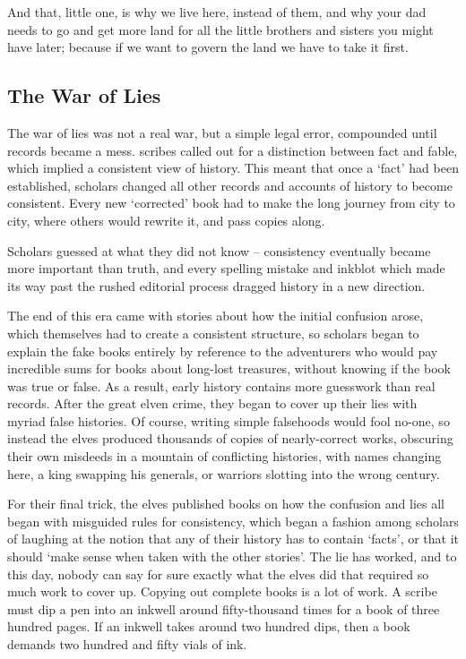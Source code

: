 \begin{multicols}{2}
\begin{exampletext}
  And that, little one, is why we live here, instead of them, and why your dad needs to go and get more land for all the little brothers and sisters you might have later; because if we want to govern the land we have to take it first.
\fi

\end{exampletext}

\subsection{The War of Lies}
\label{warOfLies}

\begin{exampletext}
  \ifcase\value{r4}\relax\or
    The war of lies was not a real war, but a simple legal error, compounded until records became a mess.
    \Glspl{scribe} called out for a distinction between fact and fable, which implied a consistent view of history.
    This meant that once a `fact' had been established, scholars changed all other records and accounts of history to become consistent.
    Every new `corrected' book had to make the long journey from city to city, where others would rewrite it, and pass copies along.

    Scholars guessed at what they did not know -- consistency eventually became more important than truth, and every spelling mistake and inkblot which made its way past the rushed editorial process dragged history in a new direction.

    The end of this era came with stories about how the initial confusion arose, which themselves had to create a consistent structure, so scholars began to explain the fake books entirely by reference to the adventurers who would pay incredible sums for books about long-lost treasures, without knowing if the book was true or false.
    As a result, early history contains more guesswork than real records.
  \or
    After the great elven crime, they began to cover up their lies with myriad false histories.
    Of course, writing simple falsehoods would fool no-one, so instead the elves produced thousands of copies of nearly-correct works, obscuring their own misdeeds in a mountain of conflicting histories, with names changing here, a king swapping his generals, or warriors slotting into the wrong century.

    For their final trick, the elves published books on how the confusion and lies all began with misguided rules for consistency, which began a fashion among scholars of laughing at the notion that any of their history has to contain `facts', or that it should `make sense when taken with the other stories'.
    The lie has worked, and to this day, nobody can say for sure exactly what the elves did that required so much work to cover up.
  \or
  Copying out complete books is a lot of work.
  A scribe must dip a pen into an inkwell around fifty-thousand times for a book of three hundred pages.
  If an inkwell takes around two hundred dips, then a book demands two hundred and fifty vials of ink.


\end{exampletext}
\end{multicols}
